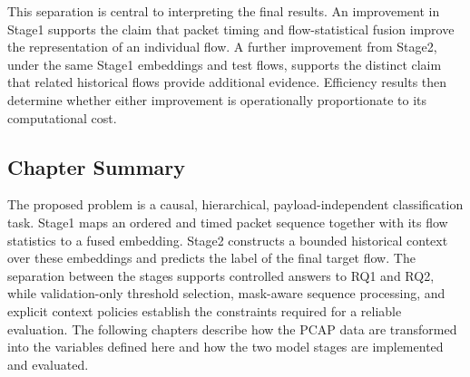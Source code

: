 This separation is central to interpreting the final results. An improvement in
Stage1 supports the claim that packet timing and flow-statistical fusion improve
the representation of an individual flow. A further improvement from Stage2,
under the same Stage1 embeddings and test flows, supports the distinct claim
that related historical flows provide additional evidence. Efficiency results
then determine whether either improvement is operationally proportionate to its
computational cost.

\subsection{Chapter Summary}
\label{subsec:problem_summary}

The proposed problem is a causal, hierarchical, payload-independent
classification task. Stage1 maps an ordered and timed packet sequence together
with its flow statistics to a fused embedding. Stage2 constructs a bounded
historical context over these embeddings and predicts the label of the final
target flow. The separation between the stages supports controlled answers to
RQ1 and RQ2, while validation-only threshold selection, mask-aware sequence
processing, and explicit context policies establish the constraints required
for a reliable evaluation. The following chapters describe how the PCAP data
are transformed into the variables defined here and how the two model stages
are implemented and evaluated.

